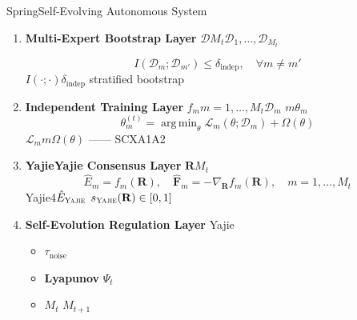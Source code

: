 \documentclass[12pt,a4paper]{article}
\theoremstyle{remark}
\newcommand{\loss}{\mathcal{L}}
\newcommand{\D}{\mathcal{D}}
\newcommand{\Yajie}{\textsc{Yajie}}
\newcommand{\Lyap}{\ensuremath{\Psi}}
\DeclareMathOperator{\argmin}{arg\,min}
\begin{document}
Spring\textbf{}Self-Evolving Autonomous System


\begin{enumerate}[label=\textbf{ \arabic*},leftmargin=*,itemsep=6pt]
    \item \textbf{Multi-Expert Bootstrap Layer}
    $\D$$M_t$$\D_1, \ldots, \D_{M_t}$
    
    \begin{equation}\label{eq:bootstrap_indep}
        I(\D_m; \D_{m'}) \leq \delta_{\text{indep}}, \quad \forall m \neq m'
    \end{equation}
    $I(\cdot;\cdot)$$\delta_{\text{indep}}$
    stratified bootstrap
    

    \item \textbf{Independent Training Layer}
    $f_m$$m = 1, \ldots, M_t$$\D_m$
    $m$$\theta_m$
    \begin{equation}\label{eq:expert_training}
        \theta_m^{(t)} = \argmin_{\theta} \loss_m(\theta; \D_m) + \Omega(\theta)
    \end{equation}
    $\loss_m$$m$$\Omega(\theta)$
    \textbf{}——
    SCXA1A2

    \item \textbf{YajieYajie Consensus Layer}
    $\mathbf{R}$$M_t$
    \begin{equation}\label{eq:expert_predictions}
        \hat{E}_m = f_m(\mathbf{R}), \quad \hat{\mathbf{F}}_m = -\nabla_{\mathbf{R}} f_m(\mathbf{R}), \quad m = 1, \ldots, M_t
    \end{equation}
    Yajie4$\hat{E}_{\Yajie}$
    $s_{\Yajie}(\mathbf{R}) \in [0,1]$

    \item \textbf{Self-Evolution Regulation Layer}
    Yajie
    \begin{itemize}[nosep]
        \item \textbf{} $\tau_{\text{noise}}$
        \item \textbf{Lyapunov} $\Lyap_t$
        \item \textbf{$M_t$} $M_{t+1}$
    \end{itemize}
\end{enumerate}
\end{document}

